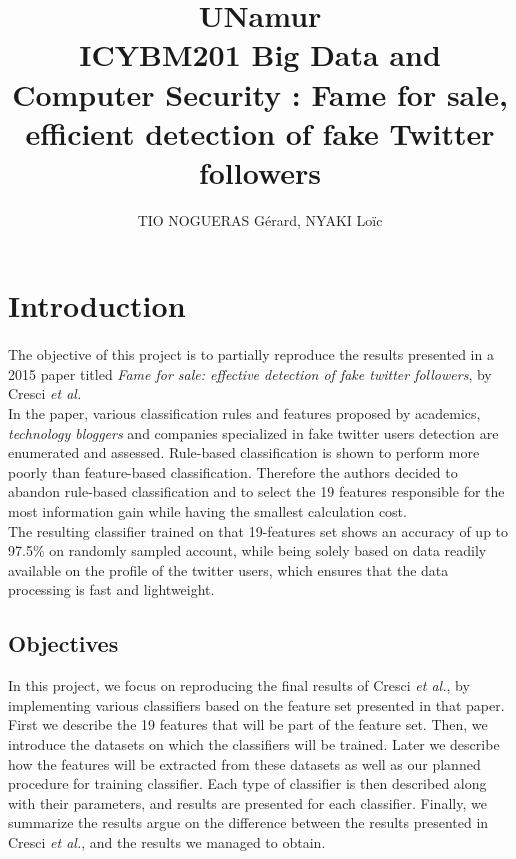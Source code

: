 \documentclass[a4paper,11pt]{article}
\title{UNamur\\
	ICYBM201 Big Data and Computer Security : Fame for sale, efficient detection of fake Twitter
followers}
\author{TIO NOGUERAS Gérard, NYAKI Loïc}
\begin{document}
\maketitle

\newpage
\tableofcontents
\newpage

\section{Introduction}

\paragraph{}
The objective of this project is to partially reproduce the results presented in a 2015 paper titled  \textit{Fame for sale: effective detection of fake twitter followers}, by Cresci \textit{et al.}\\

In the paper, various classification rules and features proposed by academics, \textit{technology bloggers} and companies specialized in fake twitter users detection are enumerated and assessed. Rule-based classification is shown to perform more poorly than feature-based classification. Therefore the authors decided to abandon rule-based classification and to select the 19 features responsible for the most information gain while having the smallest calculation cost.\\

The resulting classifier trained on that 19-features set shows an accuracy of up to 97.5\% on randomly sampled account, while being solely based on data readily available on the profile of the twitter users, which ensures that the data processing is fast and lightweight.

\subsection{Objectives}
In this project, we focus on reproducing the final results of Cresci \textit{et al.}, by implementing various classifiers based on the feature set presented in that paper.\\

First we describe the 19 features that will be part of the feature set. Then, we introduce the datasets on which the classifiers will be trained. Later we describe how the features will be extracted from these datasets as well as our planned procedure for training classifier. Each type of classifier is then described along with their parameters, and results are presented for each classifier. Finally, we summarize the results argue on the difference between the results presented in Cresci \textit{et al.}, and the results we managed to obtain.
\end{document}
